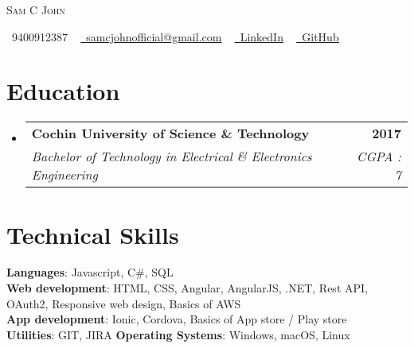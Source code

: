 \documentclass[letterpaper,11pt]{article}
\makeatletter
\newcommand{\resumeSubheading}[4]{
  \vspace{-2pt}\item
    \begin{tabular*}{1.0\textwidth}[t]{l@{\extracolsep{\fill}}r}
      \textbf{#1} & \textbf{\small #2} \\
      \textit{\small#3} & \textit{\small #4} \\
    \end{tabular*}\vspace{-7pt}
}
\newcommand{\resumeSubHeadingListStart}{\begin{itemize}[leftmargin=0.0in, label={}]}
\newcommand{\resumeSubHeadingListEnd}{\end{itemize}}
\makeatother
\begin{document}

\begin{center}
    {\Huge \scshape Sam C John } \\ \vspace{3.5pt}
   
    \small \raisebox{-0.1\height}\faPhone\ 9400912387 ~ \href{mailto:samcjohnofficial@gmail.com}{\raisebox{-0.2\height}\faEnvelope\  \underline{samcjohnofficial@gmail.com}} ~ 
    \href{https://www.linkedin.com/in/sam-c-john-a4978a182/}{\raisebox{-0.2\height}\faLinkedin\ \underline{LinkedIn}}  ~
    \href{https://github.com/SamCJohn}{\raisebox{-0.2\height}\faGithub\ \underline{GitHub}}
   
\end{center}


\section{Education}
  \resumeSubHeadingListStart
    \resumeSubheading
      {Cochin University of Science \& Technology}{2017}
      {Bachelor of Technology in Electrical \& Electronics Engineering}{CGPA : 7}
  \resumeSubHeadingListEnd

\section{Technical Skills}
 \begin{itemize}[leftmargin=0.15in, label={}]
    \small{\item{
    \vspace{5pt}
     \textbf{Languages}{: Javascript, C\#, SQL} \\
     \textbf{Web development}{: HTML, CSS, Angular, AngularJS, .NET, Rest API, OAuth2, Responsive web design, Basics of AWS} \\
     \textbf{App development}{: Ionic, Cordova, Basics of App store / Play store} \\
     \textbf{Utilities}{: GIT, JIRA}
     \textbf{Operating Systems}{: Windows, macOS, Linux}
    }}
 \end{itemize}
\end{document}
